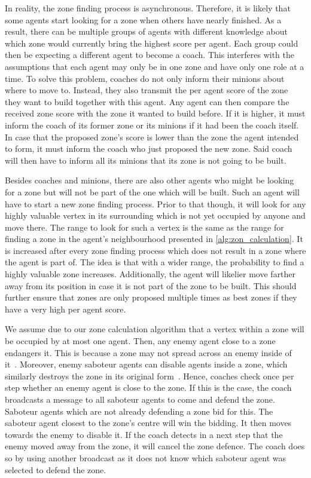 In reality, the zone finding process is asynchronous.
Therefore, it is likely that some agents start looking for a zone when others have nearly finished.
As a result, there can be multiple groups of agents with different knowledge about which zone would currently bring the highest score per agent.
Each group could then be expecting a different agent to become a coach.
This interferes with the assumptions that each agent may only be in one zone and have only one role at a time.
To solve this problem, coaches do not only inform their minions about where to move to.
Instead, they also transmit the per agent score of the zone they want to build together with this agent.
Any agent can then compare the received zone score with the zone it wanted to build before.
If it is higher, it must inform the coach of its former zone or its minions if it had been the coach itself.
In case that the proposed zone's score is lower than the zone the agent intended to form, it must inform the coach who just proposed the new zone.
Said coach will then have to inform all its minions that its zone is not going to be built.

Besides coaches and minions, there are also other agents who might be looking for a zone but will not be part of the one which will be built.
Such an agent will have to start a new zone finding process.
Prior to that though, it will look for any highly valuable vertex in its surrounding which is not yet occupied by anyone and move there.
The range to look for such a vertex is the same as the range for finding a zone in the agent's neighbourhood presented in \autoref{alg:zon_calculation}.
It is increased after every zone finding process which does not result in a zone where the agent is part of.
The idea is that with a wider range, the probability to find a highly valuable zone increases.
Additionally, the agent will likelier move farther away from its position in case it is not part of the zone to be built.
This should further ensure that zones are only proposed multiple times as best zones if they have a very high per agent score.

We assume due to our zone calculation algorithm that a vertex within a zone will be occupied by at most one agent.
Then, any enemy agent close to a zone endangers it.
This is because a zone may not spread across an enemy inside of it~\cite{ahlbrecht_mapc_2014}.  %
Moreover, enemy saboteur agents can disable agents inside a zone, which similarly destroys the zone in its original form~\cite{ahlbrecht_mapc_2014}.  %
Hence, coaches check once per step whether an enemy agent is close to the zone.
If this is the case, the coach broadcasts a message to all saboteur agents to come and defend the zone.
Saboteur agents which are not already defending a zone bid for this.
The saboteur agent closest to the zone's centre will win the bidding.
It then moves towards the enemy to disable it.
If the coach detects in a next step that the enemy moved away from the zone, it will cancel the zone defence.
The coach does so by using another broadcast as it does not know which saboteur agent was selected to defend the zone.

